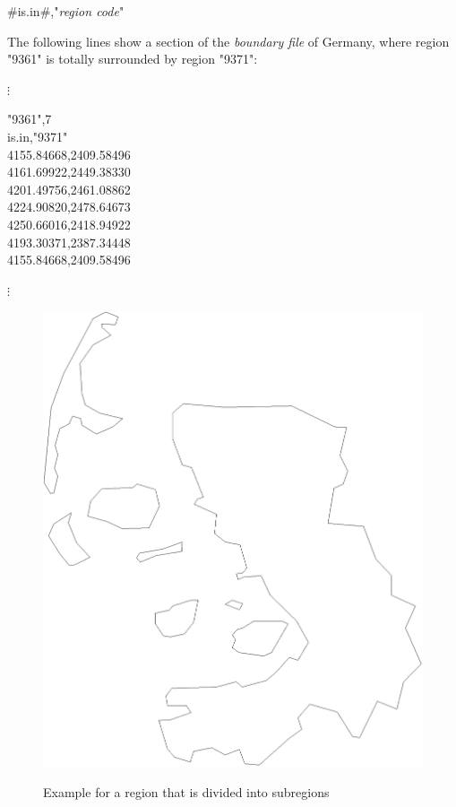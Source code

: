 #is.in#,"{\em region code}"

The following lines show a section of the {\em boundary file} of
Germany, where region "9361" is totally
surrounded by region "9371":

\footnotesize

\hspace{1cm} $\vdots$

"9361",7 \\
is.in,"9371" \\
4155.84668,2409.58496 \\
4161.69922,2449.38330 \\
4201.49756,2461.08862 \\
4224.90820,2478.64673 \\
4250.66016,2418.94922 \\
4193.30371,2387.34448 \\
4155.84668,2409.58496

\hspace{1cm} $\vdots$

\normalsize

\begin{figure}[hb]
\centering
\includegraphics [scale=0.3]{grafiken/reg1054.eps}
{\em\caption{\label{westsub} Example for a region that is divided
into subregions}}
\end{figure}

